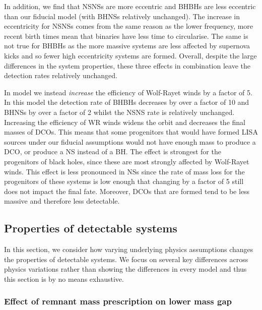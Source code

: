 In addition, we find that NSNSs are more eccentric and BHBHs are less eccentric than our fiducial model (with BHNSs relatively unchanged). The increase in eccentricity for NSNSs comes from the same reason as the lower frequency, more recent birth times mean that binaries have less time to circularise. The same is not true for BHBHs as the more massive systems are less affected by supernova kicks and so fewer high eccentricity systems are formed. Overall, despite the large differences in the system properties, these three effects in combination leave the detection rates relatively unchanged.

In model \modWRHigh{} we instead \textit{increase} the efficiency of Wolf-Rayet winds by a factor of 5. In this model the detection rate of BHBHs decreases by over a factor of 10 and BHNSs by over a factor of 2 whilst the NSNS rate is relatively unchanged. Increasing the efficiency of WR winds widens the orbit and decreases the final masses of DCOs. This means that some progenitors that would have formed LISA sources under our fiducial assumptions would not have enough mass to produce a DCO, or produce a NS instead of a BH. The effect is strongest for the progenitors of black holes, since these are most strongly affected by Wolf-Rayet winds. This effect is less pronounced in NSs since the rate of mass loss for the progenitors of these systems is low enough that changing by a factor of 5 still does not impact the final fate. Moreover, DCOs that are formed tend to be less massive and therefore less detectable. 

\subsection{Properties of detectable systems}\label{sec:property_variations}

In this section, we consider how varying underlying physics assumptions changes the properties of detectable systems. We focus on several key differences across physics variations rather than showing the differences in every model and thus this section is by no means exhaustive.

\subsubsection{Effect of remnant mass prescription on lower mass gap}\label{sec:lower_mass_gap}

